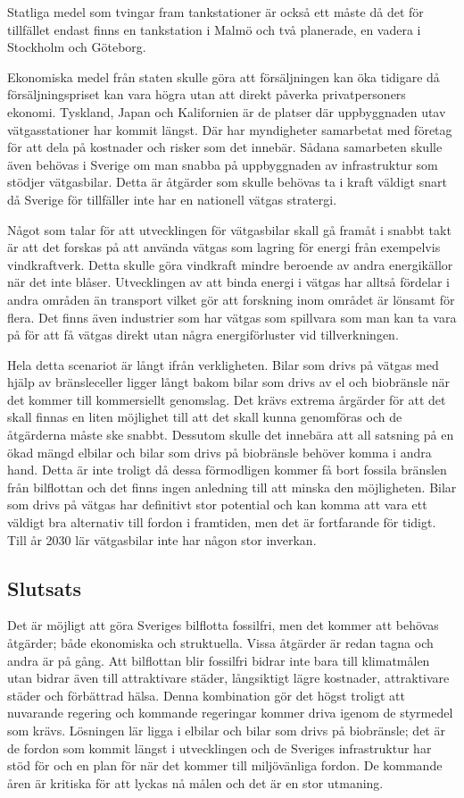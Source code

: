 \documentclass[a4paper,11pt,fleqn, titlepage]{article}
\begin{document}
Statliga medel som tvingar fram tankstationer är också ett måste då det för tillfället endast finns en tankstation i Malmö och två planerade, en vadera i Stockholm och Göteborg.

Ekonomiska medel från staten skulle göra att försäljningen kan öka tidigare då försäljningspriset kan vara högra utan att direkt påverka privatpersoners ekonomi.
Tyskland, Japan och Kalifornien är de platser där uppbyggnaden utav vätgasstationer har kommit längst. Där har myndigheter samarbetat med företag för att dela på kostnader och risker som det innebär. Sådana samarbeten skulle även behövas i Sverige om man snabba på uppbyggnaden av infrastruktur som stödjer vätgasbilar.
Detta är åtgärder som skulle behövas ta i kraft väldigt snart då Sverige för tillfäller inte har en nationell vätgas stratergi.

Något som talar för att utvecklingen för vätgasbilar skall gå framåt i snabbt takt är att det forskas på att använda vätgas som lagring för energi från exempelvis vindkraftverk. Detta skulle göra vindkraft mindre beroende av andra energikällor när det inte blåser. Utvecklingen av att binda energi i vätgas har alltså fördelar i andra områden än transport vilket gör att forskning inom området är lönsamt för flera. Det finns även industrier som har vätgas som spillvara som man kan ta vara på för att få vätgas direkt utan några energiförluster vid tillverkningen.

Hela detta scenariot är långt ifrån verkligheten. Bilar som drivs på vätgas med hjälp av bränsleceller ligger långt bakom bilar som drivs av el och biobränsle när det kommer till kommersiellt genomslag. Det krävs extrema årgärder för att det skall finnas en liten möjlighet till att det skall kunna genomföras och de åtgärderna måste ske snabbt. Dessutom skulle det innebära att all satsning på en ökad mängd elbilar och bilar som drivs på biobränsle behöver komma i andra hand. Detta är inte troligt då dessa förmodligen kommer få bort fossila bränslen från bilflottan och det finns ingen anledning till att minska den möjligheten. Bilar som drivs på vätgas har definitivt stor potential och kan komma att vara ett väldigt bra alternativ till fordon i framtiden, men det är fortfarande för tidigt. Till år 2030 lär vätgasbilar inte har någon stor inverkan.

\subsection{Slutsats}
Det är möjligt att göra Sveriges bilflotta fossilfri, men det kommer att behövas åtgärder; både ekonomiska och struktuella. Vissa åtgärder är redan tagna och andra är på gång. Att bilflottan blir fossilfri bidrar inte bara till klimatmålen utan bidrar även till attraktivare städer, långsiktigt lägre kostnader, attraktivare städer och förbättrad hälsa. Denna kombination gör det högst troligt att nuvarande regering och kommande regeringar kommer driva igenom de styrmedel som krävs. Lösningen lär ligga i elbilar och bilar som drivs på biobränsle; det är de fordon som kommit längst i utvecklingen och de Sveriges infrastruktur har stöd för och en plan för när det kommer till miljövänliga fordon. De kommande åren är kritiska för att lyckas nå målen och det är en stor utmaning.
\printbibliography
\end{document}
